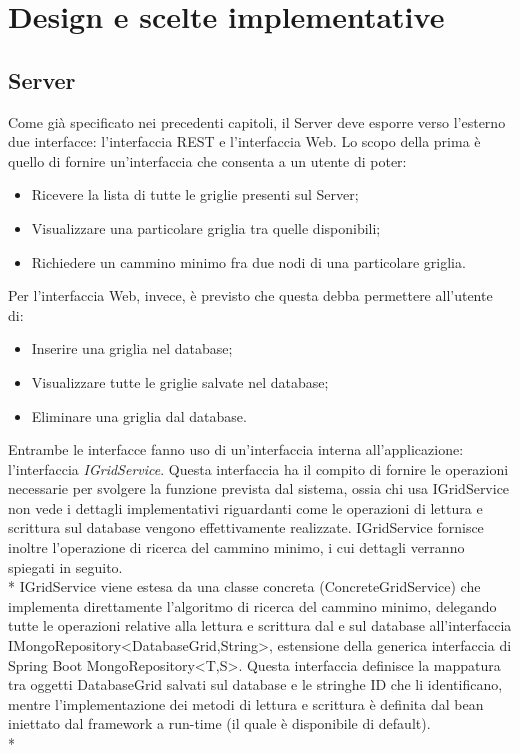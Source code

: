 \chapter{Design e scelte implementative}

\section{Server}

Come gi\`a specificato nei precedenti capitoli, il Server deve esporre verso l'esterno due interfacce: l'interfaccia REST e l'interfaccia Web. Lo scopo della prima \`e quello di fornire un'interfaccia che consenta a un utente di poter:
\begin{itemize}
	\item Ricevere la lista di tutte le griglie presenti sul Server;
	\item Visualizzare una particolare griglia tra quelle disponibili;
	\item Richiedere un cammino minimo fra due nodi di una particolare griglia.
\end{itemize}
Per l'interfaccia Web, invece, \`e previsto che questa debba permettere all'utente di:
\begin{itemize}
	\item Inserire una griglia nel database;
	\item Visualizzare tutte le griglie salvate nel database;
	\item Eliminare una griglia dal database.
\end{itemize}
Entrambe le interfacce fanno uso di un'interfaccia interna all'applicazione: l'interfaccia \emph{IGridService}. Questa interfaccia ha il compito di fornire le operazioni necessarie per svolgere la funzione prevista dal sistema, ossia chi usa IGridService non vede i dettagli implementativi riguardanti come le operazioni di lettura e scrittura sul database vengono effettivamente realizzate. IGridService fornisce inoltre l'operazione di ricerca del cammino minimo, i cui dettagli verranno spiegati in seguito.\\*
IGridService viene estesa da una classe concreta (ConcreteGridService) che implementa direttamente l'algoritmo di ricerca del cammino minimo, delegando tutte le operazioni relative alla lettura e scrittura dal e sul database all'interfaccia IMongoRepository<DatabaseGrid,String>, estensione della generica interfaccia di Spring Boot MongoRepository<T,S>. Questa interfaccia definisce la mappatura tra oggetti DatabaseGrid salvati sul database e le stringhe ID che li identificano, mentre l'implementazione dei metodi di lettura e scrittura \`e definita dal bean iniettato dal framework a run-time (il quale \`e disponibile di default).\\*

